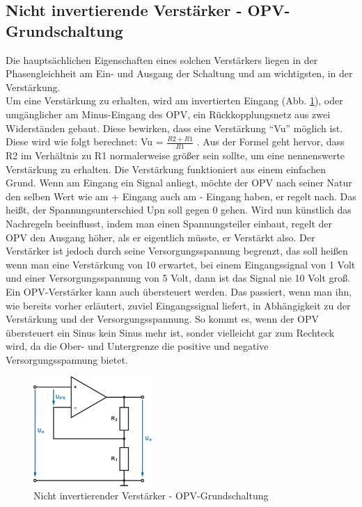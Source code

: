 \subsection{Nicht invertierende Verstärker - OPV-Grundschaltung}\label{sec:8.5}
Die hauptsächlichen Eigenschaften eines solchen Verstärkers liegen in der Phasengleichheit am Ein- und Ausgang der Schaltung und am wichtigsten, in der Verstärkung. \\
Um eine Verstärkung zu erhalten, wird am invertierten Eingang (Abb. \ref{fig:8.5.1}), oder umgänglicher am Minus-Eingang des OPV, ein Rückkopplungsnetz aus zwei Widerständen gebaut.
Diese bewirken, dass eine Verstärkung \enquote{Vu} möglich ist.
Diese wird wie folgt berechnet: Vu = $\frac{R2+R1}{R1}$ .
Aus der Formel geht hervor, dass R2 im Verhältnis zu R1 normalerweise größer sein sollte, um eine nennenswerte Verstärkung zu erhalten.
Die Verstärkung funktioniert aus einem einfachen Grund.
Wenn am Eingang ein Signal anliegt, möchte der OPV nach seiner Natur den selben Wert wie am + Eingang auch am - Eingang haben, er regelt nach.
Das heißt, der Spannungsunterschied Upn soll gegen 0 gehen.
Wird nun künstlich das Nachregeln beeinflusst, indem man einen Spannungsteiler einbaut, regelt der OPV den Ausgang höher, als er eigentlich müsste, er Verstärkt also.
Der Verstärker ist jedoch durch seine Versorgungsspannung begrenzt, das soll heißen wenn man eine Verstärkung von 10 erwartet, bei einem Eingangssignal von 1 Volt und einer Versorgungsspannung von 5 Volt, dann ist das Signal nie 10 Volt groß.
Ein OPV-Verstärker kann auch übersteuert werden.
Das passiert, wenn man ihn, wie bereits vorher erläutert, zuviel Eingangssignal liefert, in Abhängigkeit zu der Verstärkung und der Versorgungsspannung.
So kommt es, wenn der OPV übersteuert ein Sinus kein Sinus mehr ist, sonder vielleicht gar zum Rechteck wird, da die Ober- und Untergrenze die positive und negative Versorgungsspannung bietet.
\begin{figure} [H]
	\centering	
	\includegraphics[width=0.4\textwidth]{img/Grundlagen/OPV-Verstaerker/OPV-VerstaerkerGrundschaltung.png}
	\caption[Nicht invertierender Verstärker - OPV-Grundschaltung]{Nicht invertierender Verstärker - OPV-Grundschaltung\footnotemark}
	\label {fig:8.5.1}
\end{figure}

